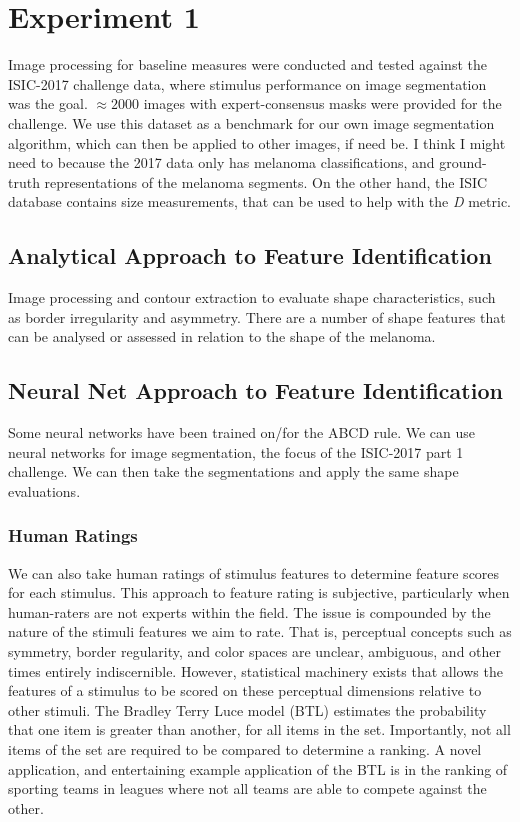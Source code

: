 \documentclass[a4paper, natbib, doc, 12pt]{apa7}
\begin{document}
\section{Experiment 1}
Image processing for baseline measures were conducted and tested against the ISIC-2017 challenge data, where stimulus performance on image segmentation was the goal. $\approx2000$ images with expert-consensus masks were provided for the challenge. We use this dataset as a benchmark for our own image segmentation algorithm, which can then be applied to other images, if need be. I think I might need to because the 2017 data only has melanoma classifications, and ground-truth representations of the melanoma segments. On the other hand, the ISIC database contains size measurements, that can be used to help with the \textit{D} metric. 

\subsection{Analytical Approach to Feature Identification}
Image processing and contour extraction to evaluate shape characteristics, such as border irregularity and asymmetry. There are a number of shape features that can be analysed or assessed in relation to the shape of the melanoma.

\subsection{Neural Net Approach to Feature Identification}
Some neural networks have been trained on/for the ABCD rule. 
We can use neural networks for image segmentation, the focus of the ISIC-2017 part 1 challenge. We can then take the segmentations and apply the same shape evaluations. 

\subsubsection{Human Ratings}
We can also take human ratings of stimulus features to determine feature scores for each stimulus. This approach to feature rating is subjective, particularly when human-raters are not experts within the field. The issue is compounded by the nature of the stimuli features we aim to rate. That is, perceptual concepts such as symmetry, border regularity, and color spaces are unclear, ambiguous, and other times entirely indiscernible. However, statistical machinery exists that allows the features of a stimulus to be scored on these perceptual dimensions relative to other stimuli. The Bradley Terry Luce model (BTL) estimates the probability that one item is greater than another, for all items in the set. Importantly, not all items of the set are required to be compared to determine a ranking. A novel application, and entertaining example application of the BTL is in the ranking of sporting teams in leagues where not all teams are able to compete against the other. 
\end{document}
